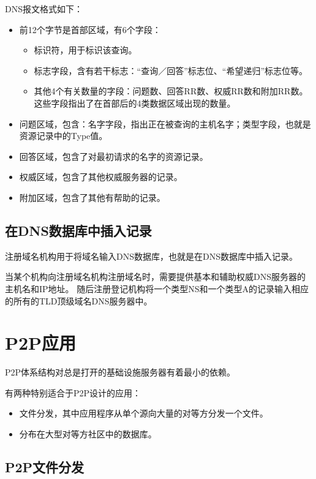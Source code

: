\documentclass[a4paper,left=2.5cm,right=2.5cm,11pt]{article}
\begin{document}
	DNS报文格式如下：
	\begin{itemize}
		\item 前12个字节是首部区域，有6个字段：
		\begin{itemize}
			\item 标识符，用于标识该查询。
			\item 标志字段，含有若干标志：“查询／回答”标志位、“希望递归”标志位等。
			\item 其他4个有关数量的字段：问题数、回答RR数、权威RR数和附加RR数。这些字段指出了在首部后的4类数据区域出现的数量。
		\end{itemize}

		\item 问题区域，包含：名字字段，指出正在被查询的主机名字；类型字段，也就是资源记录中的Type值。

		\item 回答区域，包含了对最初请求的名字的资源记录。

		\item 权威区域，包含了其他权威服务器的记录。

		\item 附加区域，包含了其他有帮助的记录。
	\end{itemize}

\subsection{在DNS数据库中插入记录}
	注册域名机构用于将域名输入DNS数据库，也就是在DNS数据库中插入记录。\par

	当某个机构向注册域名机构注册域名时，需要提供基本和辅助权威DNS服务器的主机名和IP地址。
	随后注册登记机构将一个类型NS和一个类型A的记录输入相应的所有的TLD顶级域名DNS服务器中。

\section{P2P应用}
	P2P体系结构对总是打开的基础设施服务器有着最小的依赖。\par

	有两种特别适合于P2P设计的应用：
	\begin{itemize}
		\item 文件分发，其中应用程序从单个源向大量的对等方分发一个文件。
		\item 分布在大型对等方社区中的数据库。
	\end{itemize}

\subsection{P2P文件分发}
\end{document}
